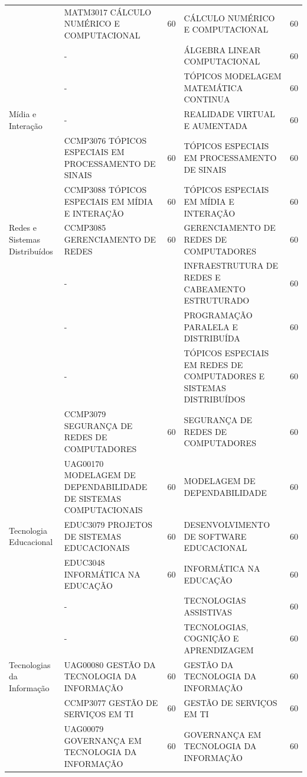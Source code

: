 \documentclass[
	12pt,				%
	openright,			%
  oneside,     %
	a4paper,			%
 hyphens,
	chapter=TITLE,		%
	english,			%
	french,				%
	spanish,			%
	brazil				%
	]{abntex2}
\begin{document}
\begin{center}
\begin{tiny}
\begin{longtable}{p{2cm}p{5.4cm}cp{5.4cm}c}
      & MATM3017 CÁLCULO NUMÉRICO E COMPUTACIONAL & 60 & CÁLCULO NUMÉRICO E COMPUTACIONAL & 60 \\ \cline{2-5}
      & - & & ÁLGEBRA LINEAR COMPUTACIONAL & 60 \\ \cline{2-5}
      & - & & TÓPICOS MODELAGEM MATEMÁTICA CONTINUA & 60 \\ \midrule
    Mídia e Interação & - & & REALIDADE VIRTUAL E AUMENTADA & 60 \\ \cline{2-5}
      & CCMP3076 TÓPICOS ESPECIAIS EM PROCESSAMENTO DE SINAIS & 60 & TÓPICOS ESPECIAIS EM PROCESSAMENTO DE SINAIS & 60 \\ \cline{2-5}
      & CCMP3088 TÓPICOS ESPECIAIS EM MÍDIA E INTERAÇÃO & 60 & TÓPICOS ESPECIAIS EM MÍDIA E INTERAÇÃO & 60 \\ \midrule
    Redes e Sistemas Distribuídos & CCMP3085 GERENCIAMENTO DE REDES & 60 & GERENCIAMENTO DE REDES DE COMPUTADORES & 60 \\ \cline{2-5}
      & - & & INFRAESTRUTURA DE REDES E CABEAMENTO ESTRUTURADO & 60  \\ \cline{2-5}
      & - & & PROGRAMAÇÃO PARALELA E DISTRIBUÍDA & 60 \\ \cline{2-5}
      & - & & TÓPICOS ESPECIAIS EM REDES DE COMPUTADORES E SISTEMAS DISTRIBUÍDOS & 60 \\ \cline{2-5}
      & CCMP3079 SEGURANÇA DE REDES DE COMPUTADORES & 60 & SEGURANÇA DE REDES DE COMPUTADORES & 60 \\ \cline{2-5}
      & UAG00170 MODELAGEM DE DEPENDABILIDADE DE SISTEMAS COMPUTACIONAIS & 60 & MODELAGEM DE DEPENDABILIDADE & 60  \\ \midrule
    Tecnologia Educacional & EDUC3079 PROJETOS DE SISTEMAS EDUCACIONAIS & 60 & DESENVOLVIMENTO DE SOFTWARE EDUCACIONAL & 60 \\ \cline{2-5}
      & EDUC3048 INFORMÁTICA NA EDUCAÇÃO & 60 & INFORMÁTICA NA EDUCAÇÃO & 60 \\ \cline{2-5}
      & - & & TECNOLOGIAS ASSISTIVAS & 60 \\ \cline{2-5}
      & - & & TECNOLOGIAS, COGNIÇÃO E APRENDIZAGEM & 60 \\ \midrule
    Tecnologias da Informação & UAG00080 GESTÃO DA TECNOLOGIA DA INFORMAÇÃO & 60 & GESTÃO DA TECNOLOGIA DA INFORMAÇÃO & 60 \\ \cline{2-5}
      & CCMP3077 GESTÃO DE SERVIÇOS EM TI & 60 & GESTÃO DE SERVIÇOS EM TI & 60 \\ \cline{2-5}
      & UAG00079 GOVERNANÇA EM TECNOLOGIA DA INFORMAÇÃO & 60 & GOVERNANÇA EM TECNOLOGIA DA INFORMAÇÃO & 60 \\ \cline{2-5}

\end{longtable}
\end{tiny}
\end{center}
\end{document}
